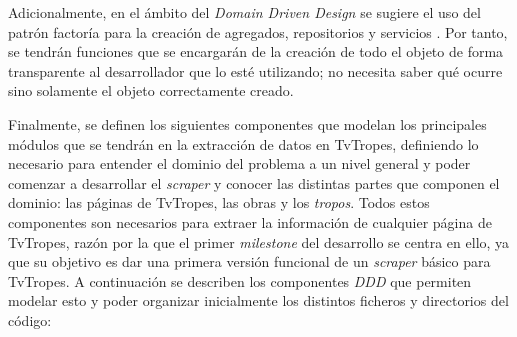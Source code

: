 Adicionalmente, en el ámbito del \textit{Domain Driven Design} se sugiere el uso
del patrón factoría para la creación de agregados, repositorios y servicios
\cite{ddd_golang}. Por tanto, se tendrán funciones que se encargarán de la
creación de todo el objeto de forma transparente al desarrollador que lo esté
utilizando; no necesita saber qué ocurre sino solamente el objeto correctamente
creado.

Finalmente, se definen los siguientes componentes que modelan los principales
módulos que se tendrán en la extracción de datos en TvTropes, definiendo lo
necesario para entender el dominio del problema a un nivel general y poder
comenzar a desarrollar el \textit{scraper} y conocer las distintas partes que
componen el dominio: las páginas de TvTropes, las obras y los \textit{tropos}.
Todos estos componentes son necesarios para extraer la información de cualquier
página de TvTropes, razón por la que el primer \textit{milestone} del desarrollo
se centra en ello, ya que su objetivo es dar una primera versión funcional de un
\textit{scraper} básico para TvTropes. A continuación se describen los
componentes \textit{DDD} que permiten modelar esto y poder organizar
inicialmente los distintos ficheros y directorios del código: 
